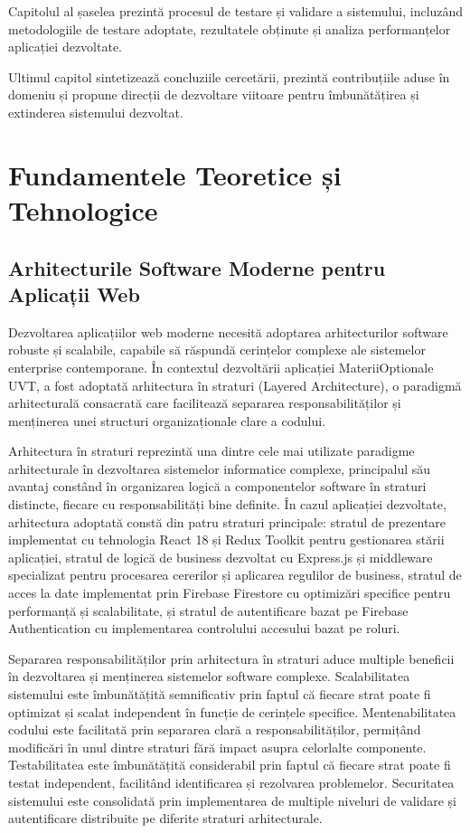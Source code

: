 \documentclass[12pt,a4paper]{report}
\begin{document}
Capitolul al șaselea prezintă procesul de testare și validare a sistemului, incluzând metodologiile de testare adoptate, rezultatele obținute și analiza performanțelor aplicației dezvoltate.

Ultimul capitol sintetizează concluziile cercetării, prezintă contribuțiile aduse în domeniu și propune direcții de dezvoltare viitoare pentru îmbunătățirea și extinderea sistemului dezvoltat.

\chapter{Fundamentele Teoretice și Tehnologice}

\section{Arhitecturile Software Moderne pentru Aplicații Web}

Dezvoltarea aplicațiilor web moderne necesită adoptarea arhitecturilor software robuste și scalabile, capabile să răspundă cerințelor complexe ale sistemelor enterprise contemporane. În contextul dezvoltării aplicației MateriiOptionale UVT, a fost adoptată arhitectura în straturi (Layered Architecture), o paradigmă arhitecturală consacrată care facilitează separarea responsabilităților și menținerea unei structuri organizaționale clare a codului.

Arhitectura în straturi reprezintă una dintre cele mai utilizate paradigme arhitecturale în dezvoltarea sistemelor informatice complexe, principalul său avantaj constând în organizarea logică a componentelor software în straturi distincte, fiecare cu responsabilități bine definite. În cazul aplicației dezvoltate, arhitectura adoptată constă din patru straturi principale: stratul de prezentare implementat cu tehnologia React 18 și Redux Toolkit pentru gestionarea stării aplicației, stratul de logică de business dezvoltat cu Express.js și middleware specializat pentru procesarea cererilor și aplicarea regulilor de business, stratul de acces la date implementat prin Firebase Firestore cu optimizări specifice pentru performanță și scalabilitate, și stratul de autentificare bazat pe Firebase Authentication cu implementarea controlului accesului bazat pe roluri.

Separarea responsabilităților prin arhitectura în straturi aduce multiple beneficii în dezvoltarea și menținerea sistemelor software complexe. Scalabilitatea sistemului este îmbunătățită semnificativ prin faptul că fiecare strat poate fi optimizat și scalat independent în funcție de cerințele specifice. Mentenabilitatea codului este facilitată prin separarea clară a responsabilităților, permițând modificări în unul dintre straturi fără impact asupra celorlalte componente. Testabilitatea este îmbunătățită considerabil prin faptul că fiecare strat poate fi testat independent, facilitând identificarea și rezolvarea problemelor. Securitatea sistemului este consolidată prin implementarea de multiple niveluri de validare și autentificare distribuite pe diferite straturi arhitecturale.
\end{document}
